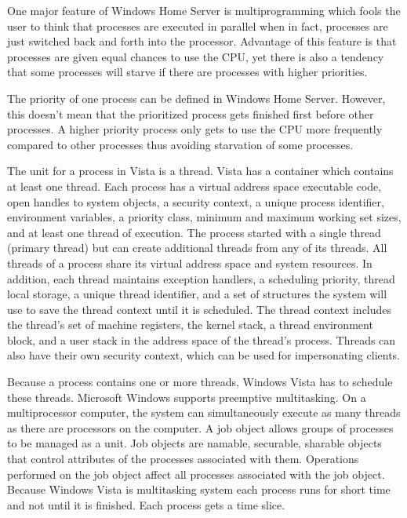 \documentclass[a4paper, 12pt]{article}
\begin{document}
One major feature of Windows Home Server is multiprogramming which fools the user to think that processes are executed in parallel when in fact, processes are just switched back and forth into the processor. Advantage of this feature is that processes are given equal chances to use the CPU, yet there is also a tendency that some processes will starve if there are processes with higher priorities. 

The priority of one process can be defined in Windows Home Server. However, this doesn't mean that the prioritized process gets finished first before other processes. A higher priority process only gets to use the CPU more frequently compared to other processes thus avoiding starvation of some processes. 

The unit for a process in Vista is a thread. Vista has a container which contains at least one thread. Each process has a virtual address space executable code, open handles to system objects, a security context, a unique process identifier, environment variables, a priority class,
minimum and maximum working set sizes, and at least one thread of execution. The process started with a single thread (primary thread) but can create additional threads from any of its threads. All threads of a process share its virtual address space and system resources. In addition, each thread maintains exception handlers, a scheduling priority, thread local storage, a unique thread identifier, and a set of structures the system will use to save the thread context until it is scheduled. The thread context includes the thread’s set of machine registers, the kernel
stack, a thread environment block, and a user stack in the address space of the thread’s process. Threads can also have their own security context, which can be used for impersonating clients.

Because a process contains one or more threads, Windows Vista has to schedule these threads. Microsoft Windows supports preemptive multitasking. On a multiprocessor computer, the system can simultaneously execute as many threads as there are processors on the computer. A job object allows groups of processes to be managed as a unit. Job objects are namable, securable, sharable objects that control attributes of the processes associated with them. Operations performed on the job object affect all processes associated with the job object. Because Windows Vista is multitasking system each process runs for short time and not until it is finished. Each process gets a time slice.
\end{document}
